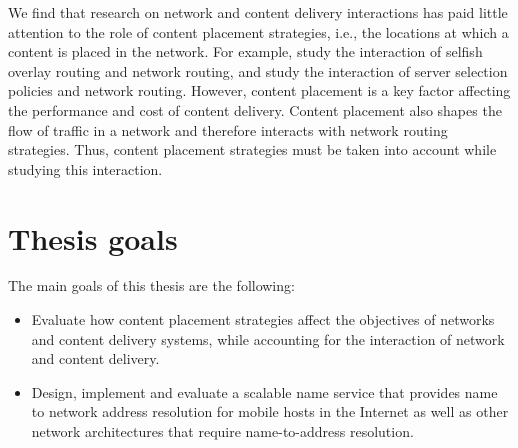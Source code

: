 
We find that research on network and content delivery interactions has paid little attention to the role of content placement strategies, i.e., the locations at which a content is placed in the network.  For example, \cite{Roughgarden,selfishQiu} study the interaction of selfish overlay routing and network routing, and \cite{P4P, JohariGameTheory, CATE} study the interaction of server selection policies and network routing. 
However, content placement is a key factor affecting the performance and cost of content delivery. Content placement also shapes the flow of traffic in a network and therefore interacts with network routing strategies. Thus, content placement strategies must be taken into account while studying this interaction.

\section{Thesis goals}

The main goals of this thesis are the following:

\begin{itemize}
\item
Evaluate how content placement strategies affect the objectives of networks and content delivery systems, while accounting for  the interaction of network and content delivery.
\item
Design, implement and evaluate a scalable name service that provides name to network address resolution for mobile hosts in the Internet as well as other network architectures that require name-to-address resolution.
\end{itemize}

